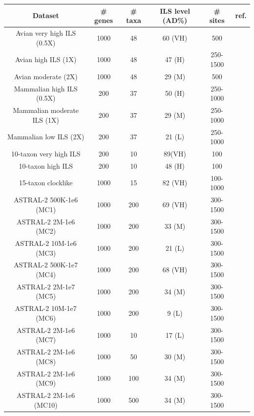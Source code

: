 \begin{table}
  \begin{tabular}{| c | c | c | c | c | c|}
    \hline
    Dataset & \# genes & \# taxa & ILS level (AD\%) & \# sites & ref.\\       
    \hline
    \hline
    Avian very  high ILS (0.5X) & 1000 & 48 & 60 (VH) & 500 & \cite{statbinningdata}\\
    Avian high  ILS (1X) & 1000 & 48 & 47 (H) & 250-1500 & \cite{statbinningdata}\\
    Avian moderate (2X) & 1000 & 48 & 29 (M) & 500 & \cite{statbinningdata}\\
    \hline
    Mammalian  high ILS (0.5X) & 200 & 37 & 50 (H) & 250-1000 & \cite{statbinningdata}\\
    Mammalian moderate ILS (1X) & 200 & 37 & 29 (M) & 250-1000 & \cite{statbinningdata}\\
    Mammalian low ILS (2X) & 200 & 37 & 21 (L) & 250-1000 & \cite{statbinningdata}\\
    \hline
    10-taxon very high ILS & 200 & 10 & 89(VH)  &  100 & \cite{bayzid2014weighted}\\
    10-taxon high ILS  & 200 & 10 & 48 (H) &  100 &\cite{bayzid2014weighted}\\
    \hline
    15-taxon clocklike  & 1000 & 15 & 82 (VH) & 100-1000 & \cite{bayzid2014weighted}\\
    \hline
    ASTRAL-2 500K-1e6 (MC1) & 1000 & 200 & 69 (VH) & 300-1500& \cite{ASTRALII}\\   
    ASTRAL-2 2M-1e6 (MC2) & 1000 & 200 & 33 (M) & 300-1500& \cite{ASTRALII}\\   
    ASTRAL-2 10M-1e6 (MC3) & 1000 & 200 & 21 (L)  & 300-1500& \cite{ASTRALII}\\
    ASTRAL-2 500K-1e7 (MC4) & 1000 & 200 & 68 (VH) & 300-1500& \cite{ASTRALII}\\
 ASTRAL-2 2M-1e7 (MC5) & 1000 & 200 & 34 (M) & 300-1500& \cite{ASTRALII}\\
ASTRAL-2 10M-1e7 (MC6) & 1000 & 200 & 9  (L) & 300-1500& \cite{ASTRALII}\\
    ASTRAL-2 2M-1e6 (MC7) & 1000 & 10 & 17 (L) & 300-1500& \cite{ASTRALII}\\
    ASTRAL-2 2M-1e6 (MC8) & 1000 & 50 & 30 (M) & 300-1500& \cite{ASTRALII}\\
    ASTRAL-2 2M-1e6 (MC9) & 1000 & 100 & 34 (M) & 300-1500& \cite{ASTRALII}\\
    ASTRAL-2 2M-1e6 (MC10)& 1000 & 500 & 34 (M) & 300-1500& \cite{ASTRALII}\\ 

\end{tabular}
\end{table}
